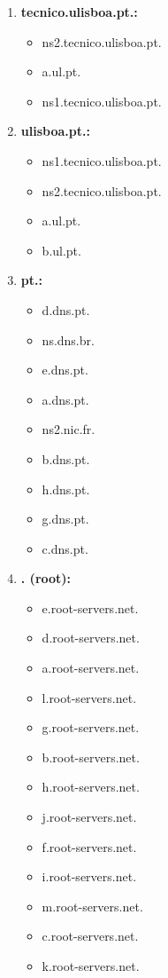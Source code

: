 \begin{enumerate}
    \item \textbf{tecnico.ulisboa.pt.:}
        \begin{itemize}
            \item ns2.tecnico.ulisboa.pt.
            \item a.ul.pt.
            \item ns1.tecnico.ulisboa.pt.
        \end{itemize}
    \item \textbf{ulisboa.pt.:}
        \begin{itemize}
            \item ns1.tecnico.ulisboa.pt.
            \item ns2.tecnico.ulisboa.pt.
            \item a.ul.pt.
            \item b.ul.pt.
        \end{itemize}
    \item \textbf{pt.:}
        \begin{itemize}
            \item d.dns.pt.
            \item ns.dns.br.
            \item e.dns.pt.
            \item a.dns.pt.
            \item ns2.nic.fr.
            \item b.dns.pt.
            \item h.dns.pt.
            \item g.dns.pt.
            \item c.dns.pt.
        \end{itemize}
    \item \textbf{. (root):}
        \begin{itemize}
            \item e.root-servers.net.
            \item d.root-servers.net.
            \item a.root-servers.net.
            \item l.root-servers.net.
            \item g.root-servers.net.
            \item b.root-servers.net.
            \item h.root-servers.net.
            \item j.root-servers.net.
            \item f.root-servers.net.
            \item i.root-servers.net.
            \item m.root-servers.net.
            \item c.root-servers.net.
            \item k.root-servers.net.
        \end{itemize}
\end{enumerate}


